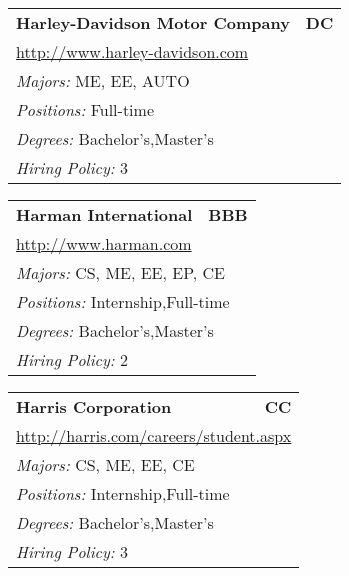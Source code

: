 \documentclass[twoside]{article}
\begin{document}
\begin{center}
\begin{multicols}{3}
\begin{FlushLeft}
\begin{minipage}{.9\columnwidth}
\end{minipage}
 
\begin{minipage}{.9\columnwidth}\begin{tabularx}{.95\columnwidth}{Xr}
                 {\Large\bf Harley-Davidson Motor Company} & {\Large\bf DC}\\
    \multicolumn{2}{p{.95\columnwidth}}{\url{http://www.harley-davidson.com}}\\
    \multicolumn{2}{p{.95\columnwidth}}{\emph{Majors:} ME, EE, AUTO}\\
    \multicolumn{2}{p{.95\columnwidth}}{\emph{Positions:} Full-time}\\
    \multicolumn{2}{p{.95\columnwidth}}{\emph{Degrees:} Bachelor's,Master's}\\
    \multicolumn{2}{p{.95\columnwidth}}{\emph{Hiring Policy:} 3}\\
    \end{tabularx}
    
\end{minipage}
 
\begin{minipage}{.9\columnwidth}\begin{tabularx}{.95\columnwidth}{Xr}
                 {\Large\bf Harman International} & {\Large\bf BBB}\\
    \multicolumn{2}{p{.95\columnwidth}}{\url{http://www.harman.com}}\\
    \multicolumn{2}{p{.95\columnwidth}}{\emph{Majors:} CS, ME, EE, EP, CE}\\
    \multicolumn{2}{p{.95\columnwidth}}{\emph{Positions:} Internship,Full-time}\\
    \multicolumn{2}{p{.95\columnwidth}}{\emph{Degrees:} Bachelor's,Master's}\\
    \multicolumn{2}{p{.95\columnwidth}}{\emph{Hiring Policy:} 2}\\
    \end{tabularx}
    
\end{minipage}
 
\begin{minipage}{.9\columnwidth}\begin{tabularx}{.95\columnwidth}{Xr}
                 {\Large\bf Harris Corporation} & {\Large\bf CC}\\
    \multicolumn{2}{p{.95\columnwidth}}{\url{http://harris.com/careers/student.aspx}}\\
    \multicolumn{2}{p{.95\columnwidth}}{\emph{Majors:} CS, ME, EE, CE}\\
    \multicolumn{2}{p{.95\columnwidth}}{\emph{Positions:} Internship,Full-time}\\
    \multicolumn{2}{p{.95\columnwidth}}{\emph{Degrees:} Bachelor's,Master's}\\
    \multicolumn{2}{p{.95\columnwidth}}{\emph{Hiring Policy:} 3}\\
    \end{tabularx}
    

\end{minipage}
\end{FlushLeft}
\end{multicols}
\end{center}
\end{document}
